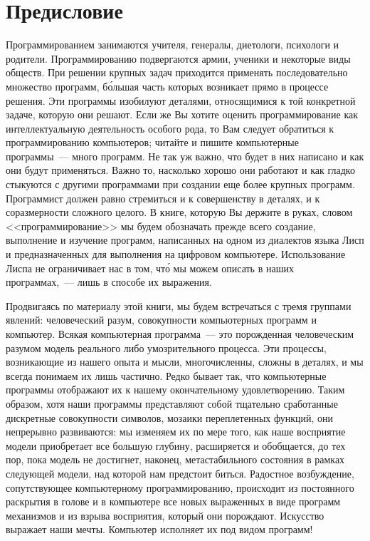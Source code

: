 \chapter*{Предисловие}
\thispagestyle{empty}

Программированием занимаются учителя, генералы, диетологи, психологи и родители.
Программированию подвергаются армии, ученики и некоторые виды обществ.
При решении крупных задач приходится применять последовательно множество
программ, б\'ольшая часть которых возникает прямо в процессе решения.
Эти программы изобилуют деталями, относящимися к той конкретной задаче,
которую они решают. Если же Вы хотите
оценить программирование как интеллектуальную деятельность особого
рода, то Вам следует обратиться к программированию компьютеров; читайте и пишите
компьютерные программы~--- много программ. Не так уж важно, что будет в них написано и
как они будут применяться.  Важно то,
насколько хорошо они работают и как гладко
стыкуются с другими программами при создании еще более крупных
программ. Программист должен равно стремиться и к совершенству в деталях, и
к соразмерности сложного целого. В книге, которую Вы держите в руках, словом <<программирование>>
мы будем обозначать прежде всего создание, выполнение и изучение программ,
написанных на одном из диалектов языка Лисп и предназначенных для выполнения на цифровом
компьютере. Использование Лиспа не ограничивает нас в том, чт\'о мы можем
описать в наших программах,~--- лишь в способе их выражения.

Продвигаясь по материалу этой книги, мы будем встречаться с тремя
группами явлений: человеческий разум, совокупности компьютерных программ и 
компьютер. Всякая компьютерная программа~--- это порожденная
человеческим разумом модель реального либо умозрительного
процесса. Эти процессы, возникающие из нашего опыта и мысли,
многочисленны, сложны в деталях, и мы всегда понимаем их лишь
частично.  Редко бывает так, что компьютерные программы
отображают их к нашему окончательному удовлетворению. Таким образом, хотя наши
программы представляют собой тщательно сработанные дискретные совокупности 
символов, мозаики переплетенных функций, они непрерывно развиваются: мы
изменяем их по мере того, как наше восприятие модели приобретает все
большую глубину, расширяется и обобщается, до тех пор, пока модель не достигнет,
наконец, метастабильного состояния в рамках следующей модели, над
которой нам предстоит биться.  Радостное возбуждение, сопутствующее
компьютерному программированию, происходит из постоянного раскрытия в
голове и в 
компьютере все новых выраженных в виде программ механизмов и из взрыва восприятия, 
который они порождают.  Искусство выражает наши мечты.
Компьютер исполняет их под видом программ!

